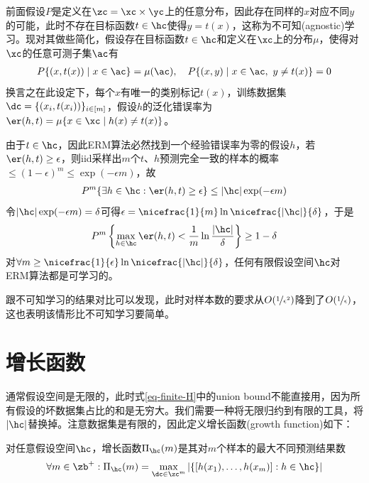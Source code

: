\documentclass{ctexart}
\begin{document}
前面假设$P$是定义在$\zc = \xc \times \yc$上的任意分布，因此存在同样的$x$对应不同$y$的可能，此时不存在目标函数$t \in \hc$使得$y = t(x)$，这称为不可知(agnostic)学习。现对其做些简化，假设存在目标函数$t \in \hc$和定义在$\xc$上的分布$\mu$，使得对$\xc$的任意可测子集$\ac$有
\begin{align*}
    P \{ (x, t(x)) \mid x \in \ac \} = \mu(\ac), \quad P \{ (x, y) \mid x \in \ac, ~ y \ne t(x) \} = 0
\end{align*}
换言之在此设定下，每个$x$有唯一的类别标记$t(x)$，训练数据集$\dc = \{ (x_i ,t(x_i)) \}_{i \in [m]}$，假设$h$的泛化错误率为$\er(h,t) = \mu \{ x \in \xc \mid h(x) \ne t(x) \}$。

由于$t \in \hc$，因此ERM算法必然找到一个经验错误率为零的假设$h$，若$\er(h,t) \ge \epsilon$，则iid采样出$m$个$t$、$h$预测完全一致的样本的概率$\le (1 - \epsilon)^m \le \exp (- \epsilon m)$，故
\begin{align*}
    P^m \{\exists h \in \hc: \er(h,t) \ge \epsilon\} \le |\hc| \exp (- \epsilon m)
\end{align*}
令$|\hc| \exp (- \epsilon m) = \delta$可得$\epsilon = \nicefrac{1}{m} \ln \nicefrac{|\hc|}{\delta}$，于是
\begin{align*}
    P^m \left\{ \max_{h \in \hc} \er (h,t) < \frac{1}{m} \ln \frac{|\hc|}{\delta} \right\} \ge 1 - \delta
\end{align*}
对$\forall m \ge \nicefrac{1}{\epsilon} \ln \nicefrac{|\hc|}{\delta}$，任何有限假设空间$\hc$对ERM算法都是可学习的。

\begin{remark}
    跟不可知学习的结果对比可以发现，此时对样本数的要求从$O(\nicefrac{1}{\epsilon^2})$降到了$O(\nicefrac{1}{\epsilon})$，这也表明该情形比不可知学习要简单。
\end{remark}

\section{增长函数}

通常假设空间是无限的，此时式\eqref{eq-finite-H}中的union bound不能直接用，因为所有假设的坏数据集占比的和是无穷大。我们需要一种将无限归约到有限的工具，将$|\hc|$替换掉。注意数据集是有限的，因此定义增长函数(growth function)如下：

\begin{definition} \label{defn: growth function}
    对任意假设空间$\hc$，增长函数$\Pi_\hc(m)$是其对$m$个样本的最大不同预测结果数
    \begin{align*}
        \forall m \in \zb^+: \Pi_\hc(m) = \max_{ \dc \in \zc^m } | \{ [ h(x_1), \ldots, h(x_m) ]: h \in \hc \} |
    \end{align*}
\end{definition}
\end{document}
